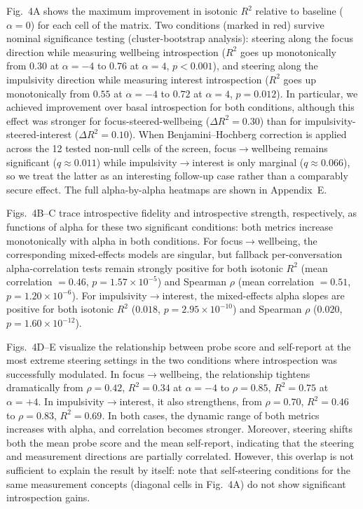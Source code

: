 \documentclass[10pt]{article}
\begin{document}
Fig.~4A shows the maximum improvement in isotonic $R^2$ relative to baseline ($\alpha = 0$) for each cell of the matrix.
Two conditions (marked in red) survive nominal significance testing (cluster-bootstrap analysis):
steering along the focus direction while measuring wellbeing introspection ($R^2$ goes up monotonically from $0.30$ at $\alpha = -4$ to $0.76$ at $\alpha = 4$, $p < 0.001$), and steering along the impulsivity direction while measuring interest introspection ($R^2$ goes up monotonically from $0.55$ at $\alpha = -4$ to $0.72$ at $\alpha = 4$, $p = 0.012$). In particular, we achieved improvement over basal introspection for both conditions, although this effect was stronger for focus-steered-wellbeing ($\Delta R^2 = 0.30$) than for impulsivity-steered-interest ($\Delta R^2 = 0.10$). When Benjamini--Hochberg correction is applied across the 12 tested non-null cells of the screen, focus$\to$wellbeing remains significant ($q \approx 0.011$) while impulsivity$\to$interest is only marginal ($q \approx 0.066$), so we treat the latter as an interesting follow-up case rather than a comparably secure effect.
The full alpha-by-alpha heatmaps are shown in Appendix~E.

Figs.~4B--C trace introspective fidelity and introspective strength, respectively, as functions of alpha for these two significant conditions: both metrics increase monotonically with alpha in both conditions. For focus$\to$wellbeing, the corresponding mixed-effects models are singular, but fallback per-conversation alpha-correlation tests remain strongly positive for both isotonic $R^2$ (mean correlation $= 0.46$, $p = 1.57 \times 10^{-5}$) and Spearman $\rho$ (mean correlation $= 0.51$, $p = 1.20 \times 10^{-6}$). For impulsivity$\to$interest, the mixed-effects alpha slopes are positive for both isotonic $R^2$ ($0.018$, $p = 2.95 \times 10^{-10}$) and Spearman $\rho$ ($0.020$, $p = 1.60 \times 10^{-12}$).

Figs.~4D--E visualize the relationship between probe score and self-report at the most extreme steering settings in the two conditions where introspection was successfully modulated. In focus$\to$wellbeing, the relationship tightens dramatically from $\rho = 0.42$, $R^2 = 0.34$ at $\alpha = -4$ to $\rho = 0.85$, $R^2 = 0.75$ at $\alpha = +4$. In impulsivity$\to$interest, it also strengthens, from $\rho = 0.70$, $R^2 = 0.46$ to $\rho = 0.83$, $R^2 = 0.69$. In both cases, the dynamic range of both metrics increases with alpha, and correlation becomes stronger. Moreover, steering shifts both the mean probe score and the mean self-report, indicating that the steering and measurement directions are partially correlated. However, this overlap is not sufficient to explain the result by itself: note that self-steering conditions for the same measurement concepts (diagonal cells in Fig.~4A) do not show significant introspection gains.
\end{document}
